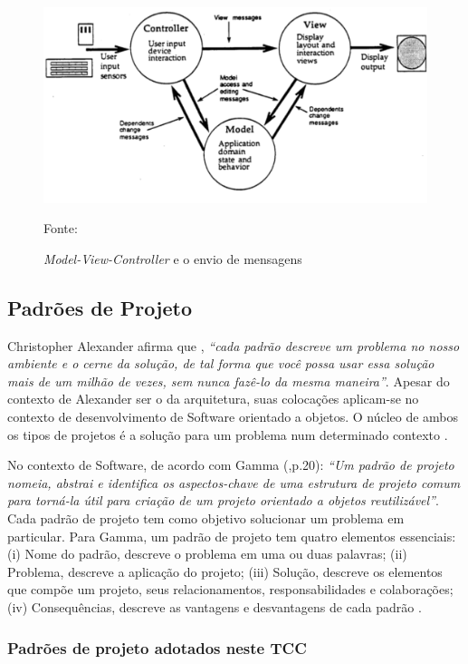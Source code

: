 \begin{figure}[h!]
\centering
\label{f06}
\includegraphics[width=1\textwidth]{figuras/f06}
\caption{\textit{Model-View-Controller }e o envio de mensagens}{Fonte:\cite{krasner1988}}
\end{figure}
\FloatBarrier

\subsection{Padrões de Projeto}

Christopher Alexander afirma que , \textit{“cada padrão descreve um problema no nosso ambiente e o cerne da solução, de tal forma que você possa usar essa solução mais de um milhão de vezes, sem nunca fazê-lo da mesma maneira”}. Apesar do contexto de Alexander ser o da arquitetura, suas colocações aplicam-se no contexto de desenvolvimento de Software orientado a objetos. O núcleo de ambos os tipos de projetos é a solução para um problema num determinado contexto \cite[p.19]{gamma2000}.

No contexto de Software, de acordo com Gamma (\citeyear{gamma2000},p.20): \textit{“Um padrão de projeto nomeia, abstrai e identifica os aspectos-chave de uma estrutura de projeto comum para torná-la útil para criação de um projeto orientado a objetos reutilizável”}. Cada padrão de projeto tem como objetivo solucionar um problema em particular. Para Gamma, um padrão de projeto tem quatro elementos essenciais: (i) Nome do padrão, descreve o problema em uma ou duas palavras; (ii) Problema, descreve a aplicação do projeto; (iii) Solução, descreve os elementos que compõe um projeto, seus relacionamentos, responsabilidades e colaborações; (iv) Consequências, descreve as vantagens e desvantagens de cada padrão \cite[p.19]{gamma2000}.

\subsubsection{Padrões de projeto adotados neste TCC}

